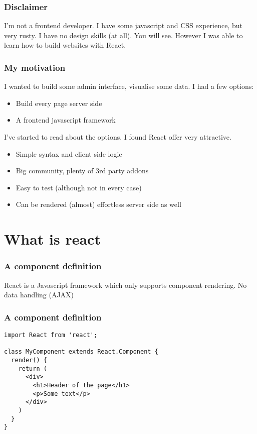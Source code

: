 \documentclass{beamer}
\begin{document}
\frame
{
  \frametitle{Disclaimer}
  
  I'm not a frontend developer. I have some javascript and CSS experience, but very rusty.
  \pause
  I have no design skills
  \pause
  (at all).
  \pause
  You will see.
  \pause
  However I was able to learn how to build websites with React.
  \pause
}


\frame
{
  \frametitle{My motivation}
  I wanted to build some admin interface, visualise some data.
  I had a few options:

  \begin{itemize}
  \item<1-> Build every page server side
  \item<2-> A frontend javascript framework
  \end{itemize}
  \pause
  \pause
  
  I've started to read about the options. I found React offer very attractive.
  
  \begin{itemize}
  \item<3-> Simple syntax and client side logic
  \item<4-> Big community, plenty of 3rd party addons
  \item<5-> Easy to test (although not in every case)
  \item<6-> Can be rendered (almost) effortless server side as well
  
  \end{itemize}
}



\section{What is react}

\begin{frame}
  \frametitle{A component definition}
  React is a Javascript framework which only supports
  component rendering.
  \pause
  No data handling (AJAX)

\end{frame}


\begin{frame}[fragile]
  \frametitle{A component definition}
   \begin{verbatim}
import React from 'react';
   
class MyComponent extends React.Component {
  render() {
    return (
      <div>
        <h1>Header of the page</h1>
        <p>Some text</p>
      </div>
    )
  }
}
   \end{verbatim}
\end{frame}
\end{document}
